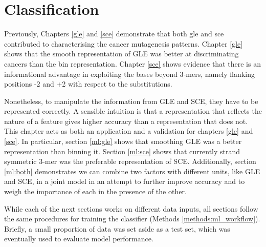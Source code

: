 \chapter{Classification}\label{ml}

Previously, Chapters \ref{gle} and \ref{sce} demonstrate that both \gls{gle} and \gls{sce} contributed to characterising the cancer mutagenesis patterns. Chapter \ref{gle} shows that the smooth representation of GLE was better at discriminating cancers than the bin representation. Chapter \ref{sce} shows evidence that there is an informational advantage in exploiting the bases beyond 3-mers, namely flanking positions -2 and +2 with respect to the substitutions. 

Nonetheless, to manipulate the information from GLE and SCE, they have to be represented correctly. A sensible intuition is that a representation that reflects the nature of a feature gives higher accuracy than a representation that does not. This chapter acts as both an application and a validation for chapters \ref{gle} and \ref{sce}. In particular, section \ref{ml:gle} shows that smoothing GLE was a better representation than binning it. Section \ref{ml:sce} shows that currently strand symmetric 3-mer was the preferable representation of SCE. Additionally, section \ref{ml:both} demonstrates we can combine two factors with different units, like GLE and SCE, in a joint model in an attempt to further improve accuracy and to weigh the importance of each in the presence of the other.

While each of the next sections works on different data inputs, all sections follow the same procedures for training the classifier (Methods \ref{methods:ml_workflow}). Briefly, a small proportion of data was set aside as a test set, which was eventually used to evaluate model performance.


